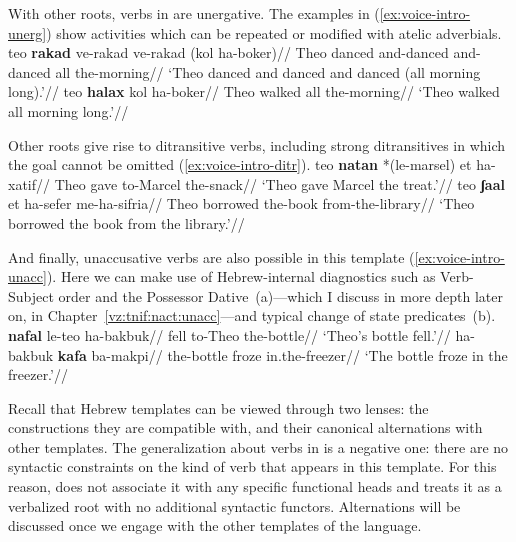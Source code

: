 With other roots, verbs in {\tkal} are unergative. The examples in (\ref{ex:voice-intro-unerg}) show activities which can be repeated or modified with atelic adverbials.
\pex\label{ex:voice-intro-unerg}
	\a \begingl
		\gla teo \textbf{rakad} ve-rakad ve-rakad (kol ha-boker)//
		\glb Theo danced and-danced and-danced all the-morning//
		\glft `Theo danced and danced and danced (all morning long).'//
	\endgl
	\a \begingl
		\gla teo \textbf{halax} kol ha-boker//
		\glb Theo walked all the-morning//
		\glft `Theo walked all morning long.'//
	\endgl
\xe

Other roots give rise to ditransitive verbs, including strong ditransitives in which the goal cannot be omitted (\ref{ex:voice-intro-ditr}).
\pex\label{ex:voice-intro-ditr}
	\a \begingl
		\gla teo \textbf{natan} *(le-marsel) et ha-xatif//
		\glb Theo gave to-Marcel   the-snack//
		\glft `Theo gave Marcel the treat.'//
	\endgl
	\a \begingl
		\gla teo \textbf{ʃaal} et ha-sefer me-ha-sifria//
		\glb Theo borrowed  the-book from-the-library//
		\glft `Theo borrowed the book from the library.'//
	\endgl
\xe

And finally, unaccusative verbs are also possible in this template (\ref{ex:voice-intro-unacc}). Here we can make use of Hebrew-internal diagnostics such as Verb-Subject order and the Possessor Dative~(\nextx a)---which I discuss in more depth later on, in Chapter~\ref{vz:tnif:nact:unacc}---and typical change of state predicates~(\nextx b).
\pex\label{ex:voice-intro-unacc}
	\a \begingl
		\gla \textbf{nafal} le-teo ha-bakbuk//
		\glb fell to-Theo the-bottle//
		\glft `Theo's bottle fell.'//
	\endgl
	\a \begingl
		\gla ha-bakbuk \textbf{kafa} ba-makpi//
		\glb the-bottle froze in.the-freezer//
		\glft `The bottle froze in the freezer.'//
	\endgl
\xe

Recall that Hebrew templates can be viewed through two lenses: the constructions they are compatible with, and their canonical alternations with other templates. The generalization about verbs in {\tkal} is a negative one: there are no syntactic constraints on the kind of verb that appears in this template. For this reason, \cite{doron03} does not associate it with any specific functional heads and \cite{borer13oup,borer15roots} treats it as a verbalized root with no additional syntactic functors. Alternations will be discussed once we engage with the other templates of the language.


